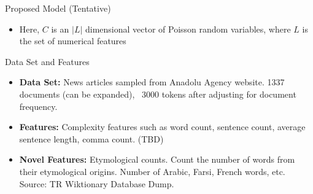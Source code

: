 \documentclass[pdf]{beamer}
\begin{document}
\begin{frame}{Proposed Model (Tentative)}
	\begin{itemize}
		  \item Here, $C$ is an $|L|$ dimensional vector of Poisson random variables, where $L$ is the set of numerical features
	\end{itemize}
\end{frame}



\begin{frame}{Data Set and Features}
	
	\begin{itemize}
		\item {\bf Data Set:} News articles sampled from Anadolu Agency website. 1337 documents (can be expanded), ~3000 tokens after adjusting for document frequency. 
		\item {\bf Features:} Complexity features such as word count, sentence count, average sentence length, comma count. (TBD)
		\item {\bf Novel Features:} Etymological counts. Count the number of words from their etymological origins. Number of Arabic, Farsi, French words, etc. Source: TR Wiktionary Database Dump.
	\end{itemize}
	
\end{frame}
\end{document}
